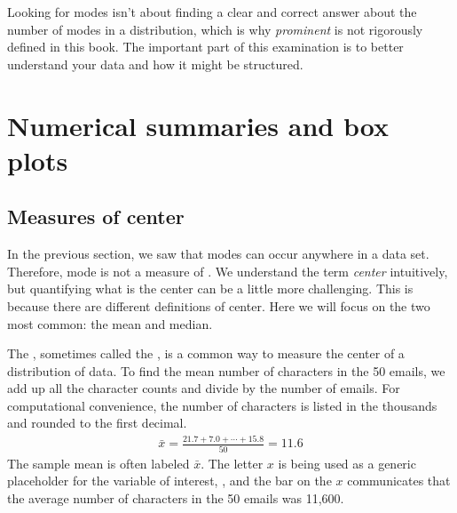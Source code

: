 \begin{tipBox}{
Looking for modes isn't about finding a clear and correct answer about the number of modes in a distribution, which is why \emph{prominent} is not rigorously defined in this book. The important part of this examination is to better understand your data and how it might be structured.}
\end{tipBox}


\section[Numerical summaries and box plots]{Numerical summaries and box plots }
\label{numericalSummariesAndBoxPlots}

\subsection{Measures of center}
\label{center}

In the previous section, we saw that modes can occur anywhere in a data set. Therefore, mode is not a measure of . We understand the term \emph{center} intuitively, but quantifying what is the center can be a little more challenging. This is because there are different definitions of center. Here we will focus on the two most common: the mean and median.

The , sometimes called the , is a common way to measure the center of a distribution of data. To find the mean number of characters in the 50 emails, we add up all the character counts and divide by the number of emails. For computational convenience, the number of characters is listed in the thousands and rounded to the first decimal.
\begin{eqnarray}
\bar{x} = \frac{21.7 + 7.0 + \cdots + 15.8}{50} = 11.6
\label{sampleMeanEquation}
\end{eqnarray}
The sample mean is often labeled $\bar{x}$. The letter $x$ is being used as a generic placeholder for the variable of interest, , and the bar on the $x$ communicates that the average number of characters in the 50 emails was 11,600.

